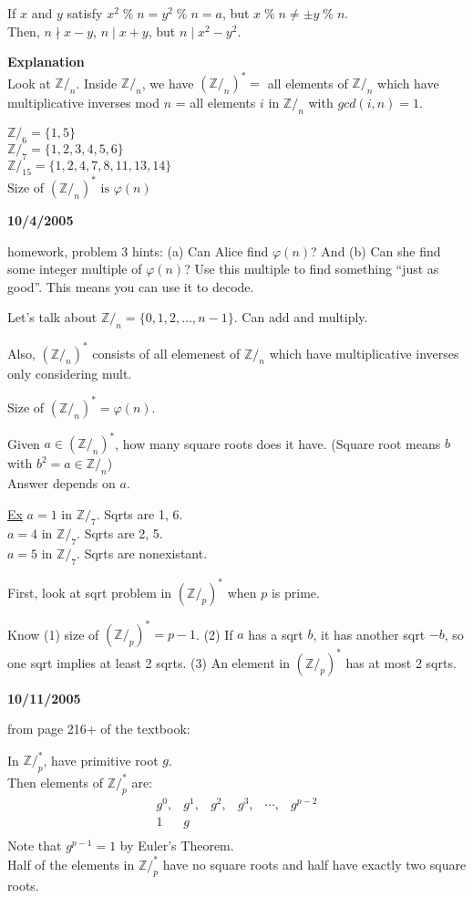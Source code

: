 If $x$ and $y$ satisfy $x^2 \;\%\; n = y^2 \;\%\; n = a$, but $x \;\%\; n \neq \pm y \;\%\; n$.\\
Then, $n \nmid x - y$, $n \mid x + y$, but $n \mid x^2 - y^2$.

\textbf{Explanation}\\
Look at $\mathbb{Z}/_n$. Inside $\mathbb{Z}/_n$, we have $(\mathbb{Z}/_n)^* = $ all elements of $\mathbb{Z}/_n$ which have multiplicative inverses mod $n$ = all elements $i$ in $\mathbb{Z}/_n$ with $gcd(i,n) = 1$.

$\mathbb{Z}/_6 = \{1,5\}$\\
$\mathbb{Z}/_7 = \{1,2,3,4,5,6\}$\\
$\mathbb{Z}/_{15} = \{1,2,4,7,8,11,13,14\}$\\
Size of $(\mathbb{Z}/_n)^* \mbox{ is } \varphi(n)$

\textbf{10/4/2005}

homework, problem 3 hints: (a) Can Alice find $\varphi(n)$? And (b) Can she find some integer multiple of $\varphi(n)$? Use this multiple to find something ``just as good''. This means you can use it to decode. 

Let's talk about $\mathbb{Z}/_n = \{0,1,2,\ldots,n-1\}$. Can add and multiply.

Also, $(\mathbb{Z}/_n)^*$ consists of all elemenest of $\mathbb{Z}/_n$ which have multiplicative inverses only considering mult.

Size of $(\mathbb{Z}/_n)^* = \varphi(n)$.

Given $a \in (\mathbb{Z}/_n)^*$, how many square roots does it have. (Square root means $b$ with $b^2=a \in \mathbb{Z}/_n$)\\
Answer depends on $a$.

\uline{Ex} 
$a = 1$ in $\mathbb{Z}/_7$. Sqrts are 1, 6.\\
$a = 4$ in $\mathbb{Z}/_7$. Sqrts are 2, 5.\\
$a = 5$ in $\mathbb{Z}/_7$. Sqrts are nonexistant.

First, look at sqrt problem in $(\mathbb{Z}/_p)^*$ when $p$ is prime.

Know (1) size of $(\mathbb{Z}/_p)^* = p-1$. (2) If $a$ has a sqrt $b$, it has another sqrt $-b$, so one sqrt implies at least 2 sqrts. (3) An element in $(\mathbb{Z}/_p)^*$ has at most 2 sqrts.

\textbf{10/11/2005}

from page 216+ of the textbook:

In $\mathbb{Z}/_p^*$, have primitive root $g$.\\
Then elements of $\mathbb{Z}/_p^*$ are:
\[
\begin{array}{cccccc}
g^0, & g^1, & g^2, & g^3, & \cdots , & g^{p-2} \\
1 & g \\
\end{array}
\]
Note that $g^{p-1} = 1$ by Euler's Theorem. \\
Half of the elements in $\mathbb{Z}/_p^*$ have no square roots and half have exactly two square roots.

